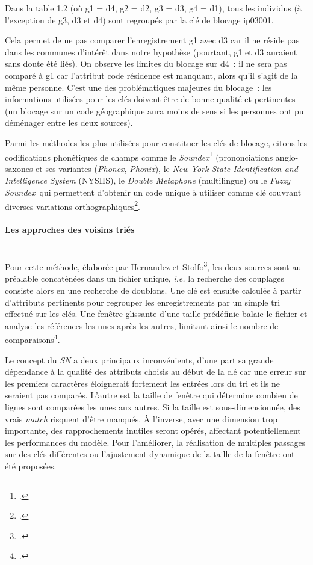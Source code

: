 \documentclass[a4paper,12pt,twoside]{book}
\begin{document}
			    Dans la table 1.2 (où g1 = d4, g2 = d2, g3 = d3, g4 = d1), tous les individus (à l'exception de g3, d3 et d4) sont regroupés par la clé de blocage \og{}ip03001\fg{}.
			    
			    Cela permet de ne pas comparer l'enregistrement g1 avec d3 car il ne réside pas dans les communes d'intérêt dans notre hypothèse (pourtant, g1 et d3 auraient sans doute été liés). On observe les limites du blocage sur d4~: il ne sera pas comparé à g1 car l'attribut code résidence est manquant, alors qu'il s'agit de la même personne. C'est une des problématiques majeures du blocage~: les informations utilisées pour les clés doivent être de bonne qualité et pertinentes (un blocage sur un code géographique aura moins de sens si les personnes ont pu déménager entre les deux sources).
			    
			    Parmi les méthodes les plus utilisées pour constituer les clés de blocage, citons les codifications phonétiques de champs comme le \textit{Soundex}\footcite{Soundex2022} (prononciations anglo-saxones et ses variantes (\textit{Phonex}, \textit{Phonix}), le \textit{New York State Identification and Intelligence System} (NYSIIS), le \textit{Double Metaphone} (multilingue) ou le \textit{Fuzzy Soundex}\, qui permettent d'obtenir un code unique à utiliser comme clé couvrant diverses variations orthographiques\footcite[][pp.~74-81]{christenDataMatchingConcepts2012}.
			    
			    \paragraph{Les approches des voisins triés}\mbox{} \\
			    
			    Pour cette méthode, élaborée par Hernandez et Stolfo\footcite{hernandezRealworldDataDirty1998}, les deux sources sont au préalable concaténées dans un fichier unique, \textit{i.e.} la recherche des couplages consiste alors en une recherche de doublons.
			    Une clé est ensuite calculée à partir d'attributs pertinents pour regrouper les enregistrements par un simple tri effectué sur les clés. Une fenêtre glissante d'une taille prédéfinie balaie le fichier et analyse les références les unes après les autres, limitant ainsi le nombre de comparaisons\footcite[Voir les illustrations et les explications dans~:][pp.~9-11]{lehtiUnsupervisedDuplicateDetection2006}.
			    
			    Le concept du \textit{SN} a deux principaux inconvénients, d'une part sa grande dépendance à la qualité des attributs choisis au début de la clé car une erreur sur les premiers caractères éloignerait fortement les entrées lors du tri et ils ne seraient pas comparés. L'autre est la taille de fenêtre qui détermine combien de lignes sont comparées les unes aux autres. Si la taille est sous-dimensionnée, des vrais \textit{match} risquent d'être manqués. À l'inverse, avec une dimension trop importante, des rapprochements inutiles seront opérés, affectant potentiellement les performances du modèle. Pour l'améliorer, la réalisation de multiples passages sur des clés différentes ou l'ajustement dynamique de la taille de la fenêtre ont été proposées.
			    
\end{document}
